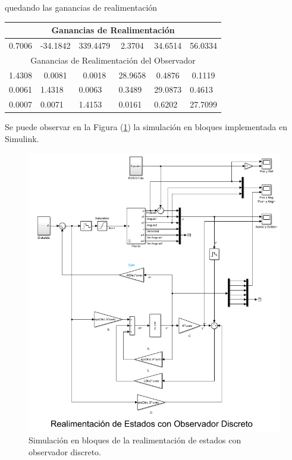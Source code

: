 quedando las ganancias de realimentación

\begin{table}[H]
\centering
\begin{tabular}{@{}clllll@{}}
\toprule
\multicolumn{6}{c}{Ganancias de Realimentación}                           \\ \midrule
0.7006 & \multicolumn{1}{c}{-34.1842} & \multicolumn{1}{c}{339.4479} & \multicolumn{1}{c}{2.3704}  & \multicolumn{1}{c}{34.6514} & \multicolumn{1}{c}{56.0334} \\ \midrule
\multicolumn{6}{c}{Ganancias de Realimentación del Observador}            \\ \midrule
1.4308 & \multicolumn{1}{c}{0.0081}   & \multicolumn{1}{c}{0.0018}   & \multicolumn{1}{c}{28.9658} & \multicolumn{1}{c}{0.4876}  & \multicolumn{1}{c}{0.1119}  \\
\multicolumn{1}{l}{0.0061} & 1.4318 & 0.0063 & 0.3489 & 29.0873 & 0.4613  \\
\multicolumn{1}{l}{0.0007} & 0.0071 & 1.4153 & 0.0161 & 0.6202  & 27.7099 \\ \bottomrule
\end{tabular}
\end{table}

Se puede observar en la Figura (\ref{fig:obsv_disc}) la simulación en bloques implementada en Simulink.

\begin{figure}[H]
	\centering
	\includegraphics[width=\linewidth]{../Modelo de Control/ImagenesModelo de Control/obsv_disc.png}
	\caption{Simulación en bloques de la realimentación de estados con observador discreto.}	
	\label{fig:obsv_disc}
\end{figure}


%